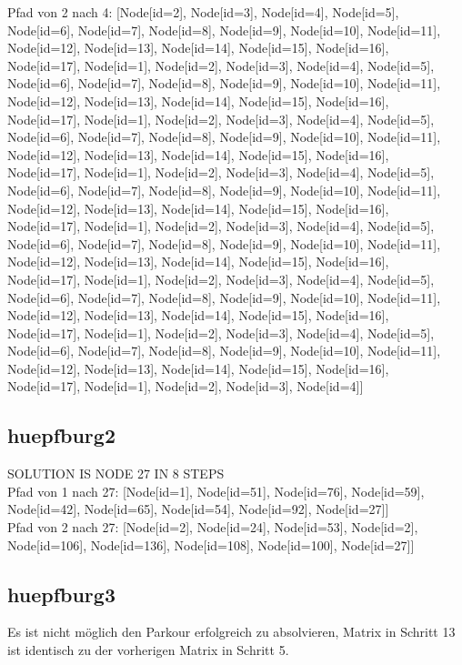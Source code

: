 Pfad von 2 nach 4: [Node[id=2], Node[id=3], Node[id=4], Node[id=5], Node[id=6], Node[id=7], Node[id=8], Node[id=9], Node[id=10], Node[id=11], Node[id=12], Node[id=13], Node[id=14], Node[id=15], Node[id=16], Node[id=17], Node[id=1], Node[id=2], Node[id=3], Node[id=4], Node[id=5], Node[id=6], Node[id=7], Node[id=8], Node[id=9], Node[id=10], Node[id=11], Node[id=12], Node[id=13], Node[id=14], Node[id=15], Node[id=16], Node[id=17], Node[id=1], Node[id=2], Node[id=3], Node[id=4], Node[id=5], Node[id=6], Node[id=7], Node[id=8], Node[id=9], Node[id=10], Node[id=11], Node[id=12], Node[id=13], Node[id=14], Node[id=15], Node[id=16], Node[id=17], Node[id=1], Node[id=2], Node[id=3], Node[id=4], Node[id=5], Node[id=6], Node[id=7], Node[id=8], Node[id=9], Node[id=10], Node[id=11], Node[id=12], Node[id=13], Node[id=14], Node[id=15], Node[id=16], Node[id=17], Node[id=1], Node[id=2], Node[id=3], Node[id=4], Node[id=5], Node[id=6], Node[id=7], Node[id=8], Node[id=9], Node[id=10], Node[id=11], Node[id=12], Node[id=13], Node[id=14], Node[id=15], Node[id=16], Node[id=17], Node[id=1], Node[id=2], Node[id=3], Node[id=4], Node[id=5], Node[id=6], Node[id=7], Node[id=8], Node[id=9], Node[id=10], Node[id=11], Node[id=12], Node[id=13], Node[id=14], Node[id=15], Node[id=16], Node[id=17], Node[id=1], Node[id=2], Node[id=3], Node[id=4], Node[id=5], Node[id=6], Node[id=7], Node[id=8], Node[id=9], Node[id=10], Node[id=11], Node[id=12], Node[id=13], Node[id=14], Node[id=15], Node[id=16], Node[id=17], Node[id=1], Node[id=2], Node[id=3], Node[id=4]]

\subsection{huepfburg2}\label{subsec:huepfburg2}
SOLUTION IS NODE 27 IN 8 STEPS \\
Pfad von 1 nach 27: [Node[id=1], Node[id=51], Node[id=76], Node[id=59], Node[id=42], Node[id=65], Node[id=54], Node[id=92], Node[id=27]] \\
Pfad von 2 nach 27: [Node[id=2], Node[id=24], Node[id=53], Node[id=2], Node[id=106], Node[id=136], Node[id=108], Node[id=100], Node[id=27]]

\subsection{huepfburg3}\label{subsec:huepfburg3}
Es ist nicht möglich den Parkour erfolgreich zu absolvieren, Matrix in Schritt 13 ist identisch zu der vorherigen Matrix in Schritt 5.

